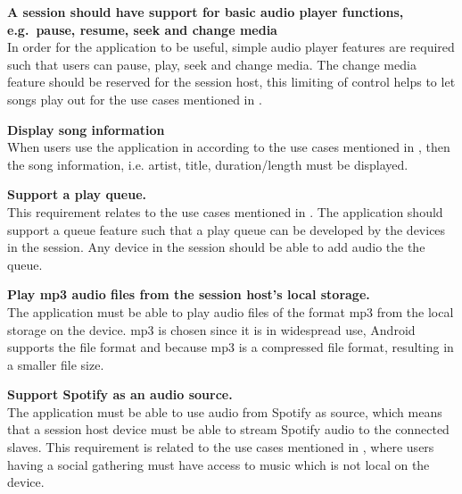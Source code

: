 \begin{eletterate}[resume]
    \item\label{req:basic} \textbf{A session should have support for basic audio player functions, e.g.~pause, resume, seek and change media} \hfill\\
        In order for the application to be useful, simple audio player features are required such that users can pause, play, seek and change media.
        The change media feature should be reserved for the session host, this limiting of control helps to let songs play out for the use cases mentioned in .

    \item\label{req:info} \textbf{Display song information} \hfill\\
        When users use the application in according to the use cases mentioned in ,
        then the song information, i.e. artist, title, duration/length must be displayed.

    \item\label{req:queue} \textbf{Support a play queue.} \hfill\\
        This requirement relates to the use cases mentioned in .
        The application should support a queue feature such that a play queue can be developed by the devices in the session.
        Any device in the session should be able to add audio the the queue.

    \item\label{req:mp3} \textbf{Play mp3 audio files from the session host's local storage.} \hfill\\
        The application must be able to play audio files of the format mp3 from the local storage on the device.
        mp3 is chosen since it is in widespread use, Android supports the file format and because mp3 is a compressed file format,
        resulting in a smaller file size\cite{android_mp3_support}\cite{mp3_compression}.

    \item\label{req:spotify} \textbf{Support Spotify as an audio source.} \hfill\\
        The application must be able to use audio from Spotify as source,
        which means that a session host device must be able to stream Spotify audio to the connected slaves.
        This requirement is related to the use cases mentioned in ,
        where users having a social gathering must have access to music which is not local on the device.
\end{eletterate}


